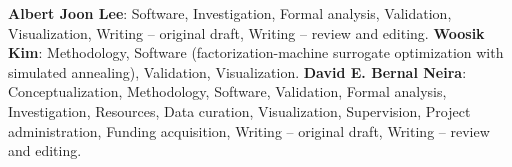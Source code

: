 \textbf{Albert Joon Lee}: Software, Investigation, Formal analysis, Validation, Visualization, Writing -- original draft, Writing -- review and editing.
\textbf{Woosik Kim}: Methodology, Software (factorization-machine surrogate optimization with simulated annealing), Validation, Visualization.
\textbf{David E. Bernal Neira}: Conceptualization, Methodology, Software, Validation, Formal analysis, Investigation, Resources, Data curation, Visualization, Supervision, Project administration, Funding acquisition, Writing -- original draft, Writing -- review and editing.
